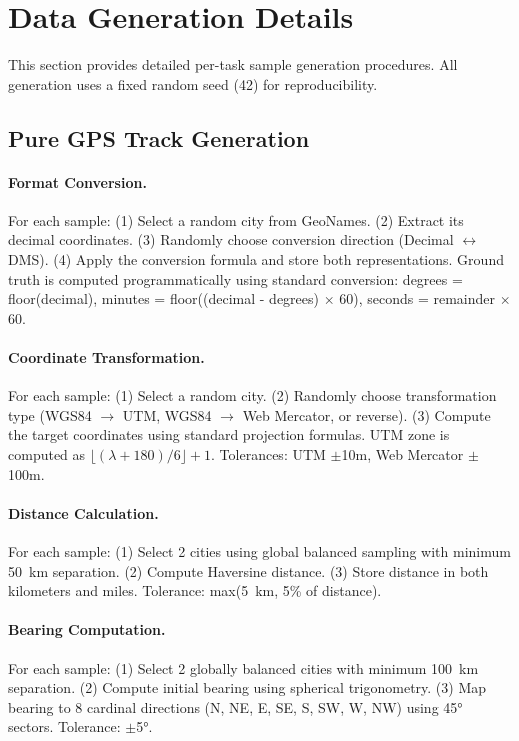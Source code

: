 \section{Data Generation Details}
\label{app:data_generation}

This section provides detailed per-task sample generation procedures. All generation uses a fixed random seed (42) for reproducibility.

\subsection{Pure GPS Track Generation}

\paragraph{Format Conversion.}
For each sample: (1) Select a random city from GeoNames. (2) Extract its decimal coordinates. (3) Randomly choose conversion direction (Decimal $\leftrightarrow$ DMS). (4) Apply the conversion formula and store both representations. Ground truth is computed programmatically using standard conversion: degrees = floor(decimal), minutes = floor((decimal - degrees) $\times$ 60), seconds = remainder $\times$ 60.

\paragraph{Coordinate Transformation.}
For each sample: (1) Select a random city. (2) Randomly choose transformation type (WGS84 $\rightarrow$ UTM, WGS84 $\rightarrow$ Web Mercator, or reverse). (3) Compute the target coordinates using standard projection formulas. UTM zone is computed as $\lfloor(\lambda + 180)/6\rfloor + 1$. Tolerances: UTM $\pm$10m, Web Mercator $\pm$100m.

\paragraph{Distance Calculation.}
For each sample: (1) Select 2 cities using global balanced sampling with minimum 50~km separation. (2) Compute Haversine distance. (3) Store distance in both kilometers and miles. Tolerance: max(5~km, 5\% of distance).

\paragraph{Bearing Computation.}
For each sample: (1) Select 2 globally balanced cities with minimum 100~km separation. (2) Compute initial bearing using spherical trigonometry. (3) Map bearing to 8 cardinal directions (N, NE, E, SE, S, SW, W, NW) using 45° sectors. Tolerance: $\pm$5°.


